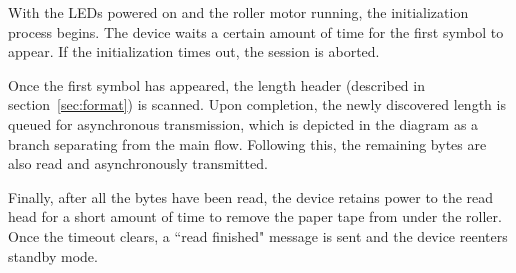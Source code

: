 \documentclass{article}
\begin{document}
	With the LEDs powered on and the roller motor running, the initialization
	process begins. The device waits a certain amount of time for the first
	symbol to appear. If the initialization times out, the session is aborted.
	
	Once the first symbol has appeared, the length header (described in
	section~\ref{sec:format}) is scanned. Upon completion, the newly discovered
	length is queued for asynchronous transmission, which is depicted in the
	diagram as a branch separating from the main flow. Following this, the
	remaining bytes are also read and asynchronously transmitted.
	
	Finally, after all the bytes have been read, the device retains power to
	the read head for a short amount of time to remove the paper tape from
	under the roller. Once the timeout clears, a ``read finished" message is
	sent and the device reenters standby mode.
	
\end{document}
